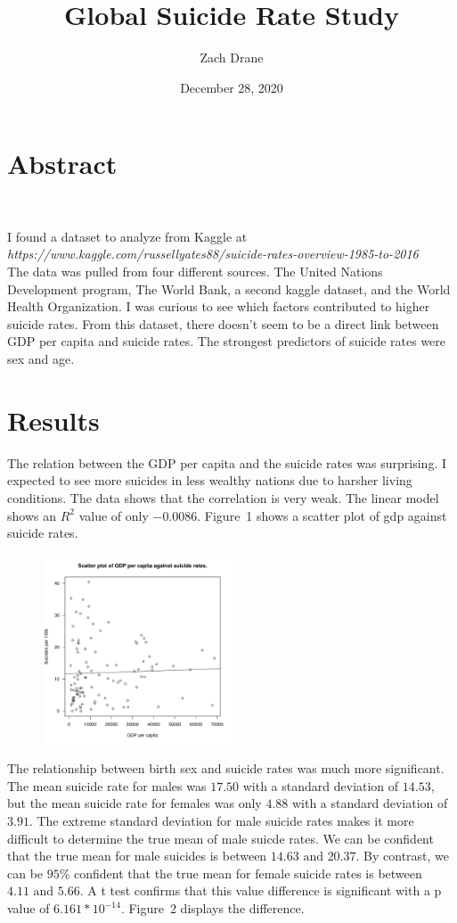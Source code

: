 \documentclass{article}
\title{Global Suicide Rate Study}
\author{Zach Drane}
\date{December 28, 2020}
\begin{document}
\section{Abstract}
\(\text{ } \)

I found a dataset to analyze from Kaggle at \\
\noindent \emph{https://www.kaggle.com/russellyates88/suicide-rates-overview-1985-to-2016}\\
The data was pulled from four different sources. The United
Nations Development program, The World Bank, a second kaggle
dataset, and the World Health Organization. I was curious to see
which factors contributed to higher suicide rates. From this
dataset, there doesn't seem to be a direct link between
GDP per capita and suicide rates. The strongest predictors of
suicide rates were sex and age.

\section{Results}

The relation between the GDP per capita and the suicide rates was surprising. I expected
to see more suicides in less wealthy nations due to harsher living conditions. The data
shows that the correlation is very weak. The linear model shows an \(R^2\) value of only
\(-0.0086\).
Figure~1 %
shows a scatter plot of gdp against suicide rates.

\begin{figure}[h!]\centering
\includegraphics[width=0.5\textwidth]{sui-by-gdp.pdf}
\label{fig::gdp}
\caption{}
\end{figure}

The relationship between birth sex and suicide rates was much more significant.
The mean suicide rate for males was \(17.50\) with a standard deviation of \(14.53\),
but the mean suicide rate for females was only \(4.88\) with a standard deviation of \(3.91\).
The extreme standard deviation for male suicide rates makes it more difficult to determine
the true mean of male suicde rates. We can be confident that the true mean for male
suicides is between \(14.63 \text{ and } 20.37\). By contrast, we can be \(95\%\) confident
that the true mean for female suicide rates is between \( 4.11 \text{ and } 5.66 \).
A t test confirms that this value difference is significant with a
p value of $6.161 * 10^{-14}$. Figure~2 %
displays the difference.
\end{document}
